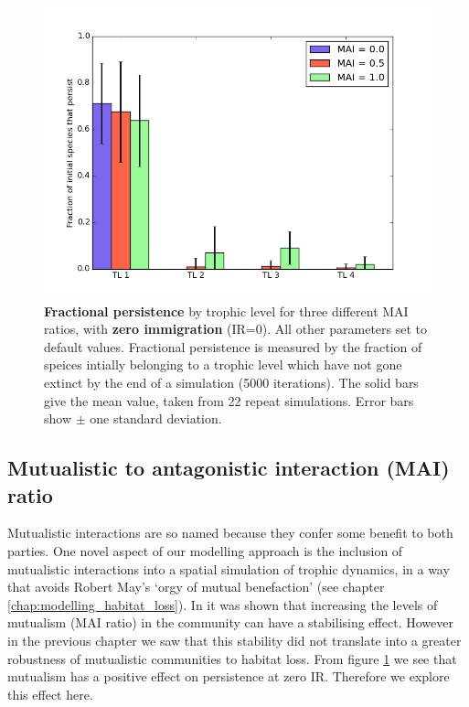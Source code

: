 \begin{figure}
	\centering
	\includegraphics[width=0.8\linewidth]{"figures/persistence/hist_species_per_tl_zeroIR"}
	\caption{\textbf{Fractional persistence} by trophic level for three different MAI ratios, with \textbf{zero immigration} (IR=0). All other parameters set to default values. Fractional persistence is measured by the fraction of speices intially belonging to a trophic level which have not gone extinct by the end of a simulation (5000 iterations). The solid bars give the mean value, taken  from 22 repeat simulations. Error bars show $\pm$ one standard deviation.}
	\label{fig:mvp_hist_zeroIR}
\end{figure}



\subsection{Mutualistic to antagonistic interaction (MAI) ratio}
\label{sec:mvp}

Mutualistic interactions are so named because they confer some benefit to both parties. One novel aspect of our modelling approach is the inclusion of mutualistic interactions into a spatial simulation of trophic dynamics, in a way that avoids Robert May's `orgy of mutual benefaction' \cite{may1981patterns} (see chapter \ref{chap:modelling_habitat_loss}). In \cite{lurgi2015effect} it was shown that increasing the levels of mutualism (MAI ratio) in the community can have a stabilising effect. However in the previous chapter we saw that this stability did not translate into a greater robustness of mutualistic communities to habitat loss. From figure \ref{fig:mvp_hist_zeroIR} we see that mutualism has a positive effect on persistence at zero IR. Therefore we explore this effect here.

